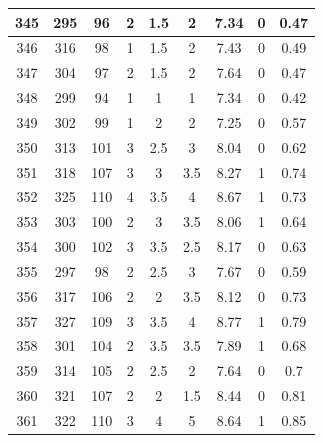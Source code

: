 \documentclass[11pt]{article}
\begin{document}
\begin{appendix}
\begin{longtable}[H]{|c|c|c|c|c|c|c|c|c|}
	345        & 295       & 96          & 2                 & 1.5 & 2   & 7.34 & 0        & 0.47            \\ \hline
	346        & 316       & 98          & 1                 & 1.5 & 2   & 7.43 & 0        & 0.49            \\ \hline
	347        & 304       & 97          & 2                 & 1.5 & 2   & 7.64 & 0        & 0.47            \\ \hline
	348        & 299       & 94          & 1                 & 1   & 1   & 7.34 & 0        & 0.42            \\ \hline
	349        & 302       & 99          & 1                 & 2   & 2   & 7.25 & 0        & 0.57            \\ \hline
	350        & 313       & 101         & 3                 & 2.5 & 3   & 8.04 & 0        & 0.62            \\ \hline
	351        & 318       & 107         & 3                 & 3   & 3.5 & 8.27 & 1        & 0.74            \\ \hline
	352        & 325       & 110         & 4                 & 3.5 & 4   & 8.67 & 1        & 0.73            \\ \hline
	353        & 303       & 100         & 2                 & 3   & 3.5 & 8.06 & 1        & 0.64            \\ \hline
	354        & 300       & 102         & 3                 & 3.5 & 2.5 & 8.17 & 0        & 0.63            \\ \hline
	355        & 297       & 98          & 2                 & 2.5 & 3   & 7.67 & 0        & 0.59            \\ \hline
	356        & 317       & 106         & 2                 & 2   & 3.5 & 8.12 & 0        & 0.73            \\ \hline
	357        & 327       & 109         & 3                 & 3.5 & 4   & 8.77 & 1        & 0.79            \\ \hline
	358        & 301       & 104         & 2                 & 3.5 & 3.5 & 7.89 & 1        & 0.68            \\ \hline
	359        & 314       & 105         & 2                 & 2.5 & 2   & 7.64 & 0        & 0.7             \\ \hline
	360        & 321       & 107         & 2                 & 2   & 1.5 & 8.44 & 0        & 0.81            \\ \hline
	361        & 322       & 110         & 3                 & 4   & 5   & 8.64 & 1        & 0.85            \\ \hline

\end{longtable}
\end{appendix}
\end{document}
